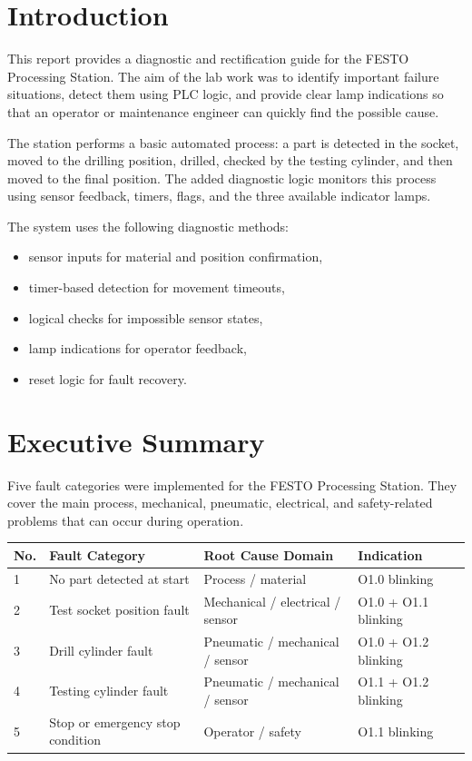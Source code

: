 \section{Introduction}

This report provides a diagnostic and rectification guide for the FESTO Processing Station. The aim of the lab work was to identify important failure situations, detect them using PLC logic, and provide clear lamp indications so that an operator or maintenance engineer can quickly find the possible cause.

The station performs a basic automated process: a part is detected in the socket, moved to the drilling position, drilled, checked by the testing cylinder, and then moved to the final position. The added diagnostic logic monitors this process using sensor feedback, timers, flags, and the three available indicator lamps.

The system uses the following diagnostic methods:

\begin{itemize}
    \item sensor inputs for material and position confirmation,
    \item timer-based detection for movement timeouts,
    \item logical checks for impossible sensor states,
    \item lamp indications for operator feedback,
    \item reset logic for fault recovery.
\end{itemize}

\section{Executive Summary}

Five fault categories were implemented for the FESTO Processing Station. They cover the main process, mechanical, pneumatic, electrical, and safety-related problems that can occur during operation.

\begin{longtable}{|p{0.8cm}|p{4.0cm}|p{4.0cm}|p{4.0cm}|}
\hline
No. & Fault Category & Root Cause Domain & Indication \\
\hline
1 & No part detected at start & Process / material & O1.0 blinking \\
\hline
2 & Test socket position fault & Mechanical / electrical / sensor & O1.0 + O1.1 blinking \\
\hline
3 & Drill cylinder fault & Pneumatic / mechanical / sensor & O1.0 + O1.2 blinking \\
\hline
4 & Testing cylinder fault & Pneumatic / mechanical / sensor & O1.1 + O1.2 blinking \\
\hline
5 & Stop or emergency stop condition & Operator / safety & O1.1 blinking \\
\hline
\end{longtable}

